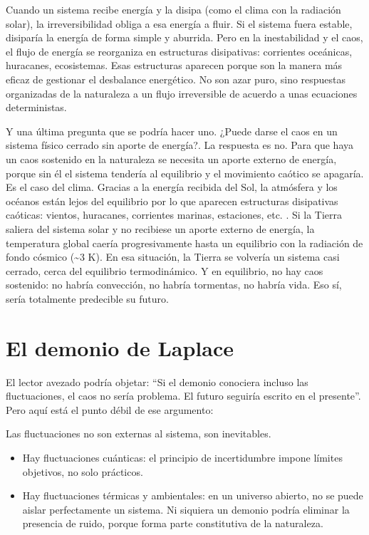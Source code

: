 \documentclass[
  10pt,
  a4paper,
  DIV=11,
  numbers=noendperiod,
  open=any]{scrreprt}
\numberwithin{equation}{chapter}
\numberwithin{equation}{section}
\renewcommand{\[}{\begin{equation}}
\renewcommand{\]}{\end{equation}}
\begin{document}
Cuando un sistema recibe energía y la disipa (como el clima con la
radiación solar), la irreversibilidad obliga a esa energía a fluir. Si
el sistema fuera estable, disiparía la energía de forma simple y
aburrida. Pero en la inestabilidad y el caos, el flujo de energía se
reorganiza en estructuras disipativas: corrientes oceánicas, huracanes,
ecosistemas. Esas estructuras aparecen porque son la manera más eficaz
de gestionar el desbalance energético. No son azar puro, sino respuestas
organizadas de la naturaleza a un flujo irreversible de acuerdo a unas
ecuaciones deterministas.

Y una última pregunta que se podría hacer uno. ¿Puede darse el caos en
un sistema físico cerrado sin aporte de energía?. La respuesta es no.
Para que haya un caos sostenido en la naturaleza se necesita un aporte
externo de energía, porque sin él el sistema tendería al equilibrio y el
movimiento caótico se apagaría. Es el caso del clima. Gracias a la
energía recibida del Sol, la atmósfera y los océanos están lejos del
equilibrio por lo que aparecen estructuras disipativas caóticas:
vientos, huracanes, corrientes marinas, estaciones, etc. . Si la Tierra
saliera del sistema solar y no recibiese un aporte externo de energía,
la temperatura global caería progresivamente hasta un equilibrio con la
radiación de fondo cósmico (\textasciitilde3 K). En esa situación, la
Tierra se volvería un sistema casi cerrado, cerca del equilibrio
termodinámico. Y en equilibrio, no hay caos sostenido: no habría
convección, no habría tormentas, no habría vida. Eso sí, sería
totalmente predecible su futuro.

\section{El demonio de Laplace}\label{el-demonio-de-laplace}

El lector avezado podría objetar: ``Si el demonio conociera incluso las
fluctuaciones, el caos no sería problema. El futuro seguiría escrito en
el presente''. Pero aquí está el punto débil de ese argumento:

Las fluctuaciones no son externas al sistema, son inevitables.

\begin{itemize}
\item
  Hay fluctuaciones cuánticas: el principio de incertidumbre impone
  límites objetivos, no solo prácticos.
\item
  Hay fluctuaciones térmicas y ambientales: en un universo abierto, no
  se puede aislar perfectamente un sistema. Ni siquiera un demonio
  podría eliminar la presencia de ruido, porque forma parte constitutiva
  de la naturaleza.
\end{itemize}
\end{document}
